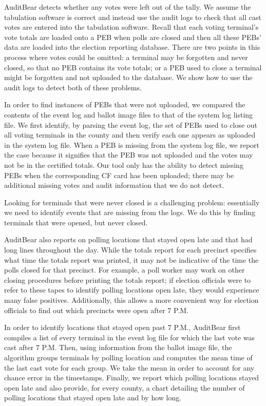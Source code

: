 \documentclass[letterpaper,twocolumn,10pt]{article}
\begin{document}
AuditBear detects whether any votes were left out of the tally. We assume the
tabulation software is correct and instead use the audit logs to check that all
cast votes are entered into the tabulation software. Recall that each voting
terminal's vote totals are loaded onto a PEB when polls are closed and then all
these PEBs' data are loaded into the election reporting database. There are two
points in this process where votes could be omitted: a terminal may be forgotten
and never closed, so that no PEB contains its vote totals; or a PEB used to
close a terminal might be forgotten and not uploaded to the database. We show
how to use the audit logs to detect both of these problems.  

In order to find instances of PEBs that were not uploaded, we
compared the contents of the event log and ballot image files to that of the
system log listing file. We first identify, by parsing the event log, the set
of PEBs used to close out all voting terminals in the county and then verify each one appears as
uploaded in the system log file. When a PEB is missing from the system log file,
we report the case because it signifies that the PEB was not uploaded and the
votes may not be in the certified totals. Our tool only has the ability to detect missing 
PEBs when the corresponding CF card has been uploaded; there may be additional missing 
votes and audit information that we do not detect.

Looking for terminals that were never closed is a challenging problem:
essentially we need to identify events that are missing from the logs. We do
this by finding terminals that were opened, but never closed.  

AuditBear also reports on polling locations that stayed open late and that had
long lines throughout the day. While the totals report for each precinct specifies 
what time the totals report was printed, it may not be indicative of the time  
the polls closed for that precinct. For example, a poll worker may work on other 
closing procedures before printing the totals report; if election officials were to 
refer to these tapes to identify polling locations open late, they would 
experience many false positives. Additionally, this allows a more convenient way for 
election officials to find out which precincts were open after 7 P.M. 

In order to 
identify locations that stayed open past 7
P.M., AuditBear first compiles a list of every terminal in the event log file
for which the last vote was cast after 7 P.M. Then, using information from the
ballot image file, the algorithm groups terminals by polling location and
computes the mean time of the last cast vote for each group. We take the mean in
order to account for any chance error in the timestamps. Finally, we report which
polling locations stayed open late and also provide, for every county, a chart
detailing the number of polling locations that stayed open late and by how
long. 
	 		
\end{document}
